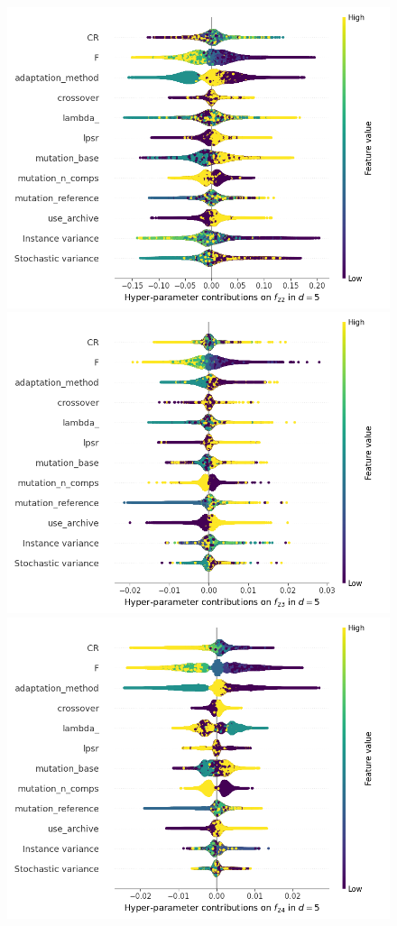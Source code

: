 \begin{figure}[t]
	\includegraphics[height=0.15\textheight,trim=60mm 0mm 30mm 0mm,clip]{de_img_new/img_summary_f22_d5.png}
	\includegraphics[height=0.15\textheight,trim=60mm 0mm 30mm 0mm,clip]{de_img_new/img_summary_f23_d5.png}
	\includegraphics[height=0.15\textheight,trim=60mm 0mm 0mm 0mm,clip]{de_img_new/img_summary_f24_d5.png}

\end{figure}
